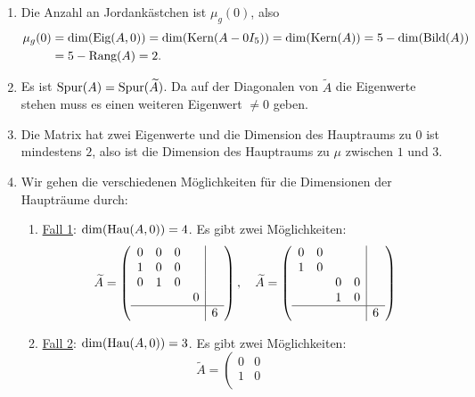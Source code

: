 \begin{enumerate}
	\item Die Anzahl an Jordankästchen ist \( \mu_g(0) \), also
		\begin{align*}
		 	\mu_g(0) &= \dim(\text{Eig}(A,0)) = \dim(\text{Kern}(A-0I_5)) = \dim(\text{Kern}(A)) = 5 - \dim(\text{Bild}(A)) \\
		 	 &= 5 - \text{Rang}(A) = 2\text{.}
		 \end{align*}
	\item Es ist \( \text{Spur}(A) = \text{Spur}(\widetilde{A}) \). Da auf der Diagonalen von \( \widetilde{A} \) die Eigenwerte stehen muss es einen weiteren Eigenwert \( \neq 0 \) geben.
	\item Die Matrix hat zwei Eigenwerte und die Dimension des Hauptraums zu \( 0 \) ist mindestens \( 2 \), also ist die Dimension des Hauptraums zu \( \mu \) zwischen \( 1 \) und \( 3 \).
	\item Wir gehen die verschiedenen Möglichkeiten für die Dimensionen der Haupträume durch:
		\begin{enumerate}
			\item \underline{Fall 1}: \( \dim(\text{Hau}(A,0))=4 \). Es gibt zwei Möglichkeiten:
				\begin{equation*}
				 	\widetilde{A} = \left( \begin{array}{cccc|c}
				 		0 & 0 & 0 & &  \\
				 		1 & 0 & 0 & &  \\
				 		0 & 1 & 0 & &  \\
				 		 & & & 0 &  \\
				 		\hline
				 		 & & & & 6
				 	\end{array} \right), \quad \widetilde{A} = \left( \begin{array}{cccc|c}
				 		0 & 0 & & &  \\
				 		1 & 0 & & &  \\
				 		 & & 0 & 0 &  \\
				 		 & & 1 & 0 &  \\
				 		\hline
				 		 & & & & 6
				 	\end{array} \right)
				 \end{equation*} 
			\item \underline{Fall 2}: \( \dim(\text{Hau}(A,0)) = 3 \). Es gibt zwei Möglichkeiten:
				\begin{equation*}
				 	\widetilde{A} = \left( \begin{array}{ccc|cc}
				 		0 & 0 & & &  \\
				 		1 & 0 & & &  \\

\end{array}
\end{equation*}
\end{enumerate}
\end{enumerate}
